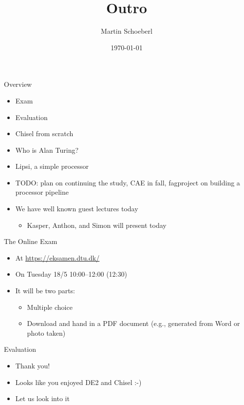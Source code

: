 

\newif\ifbook


\title{Outro}
\author{Martin Schoeberl}
\date{\today}



\begin{frame}
\titlepage
\end{frame}


\begin{frame}[fragile]{Overview}
\begin{itemize}
\item Exam
\item Evaluation
\item Chisel from scratch
\item Who is Alan Turing?
\item Lipsi, a simple processor
\item TODO: plan on continuing the study, CAE in fall, fagproject on building a processor pipeline
\item We have well known guest lectures today
\begin{itemize}
\item Kasper, Anthon, and Simon will present today
\end{itemize}
\end{itemize}
\end{frame}


\begin{frame}[fragile]{The Online Exam}
\begin{itemize}
\item At \url{https://eksamen.dtu.dk/}
\item On Tuesday 18/5 10:00--12:00 (12:30)
\item It will be two parts:
\begin{itemize}
\item Multiple choice
\item Download and hand in a PDF document (e.g., generated from Word or photo taken)
\end{itemize}
\end{itemize}
\end{frame}


\begin{frame}[fragile]{Evaluation}
\begin{itemize}
\item Thank you!
\item Looks like you enjoyed DE2 and Chisel :-)
\item Let us look into it
\end{itemize}
\end{frame}

